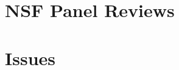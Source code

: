 \documentclass[oneside,11pt,dvipsnames]{book}
\newenvironment{commentbox}[1][]{
  \small
  \begin{mybox}
    {\small \textbf{#1}}
  }{
  \end{mybox}
}
\begin{document}


\appendix
\chapter{NSF Panel Reviews}
\chapter{Issues}











\end{document}
